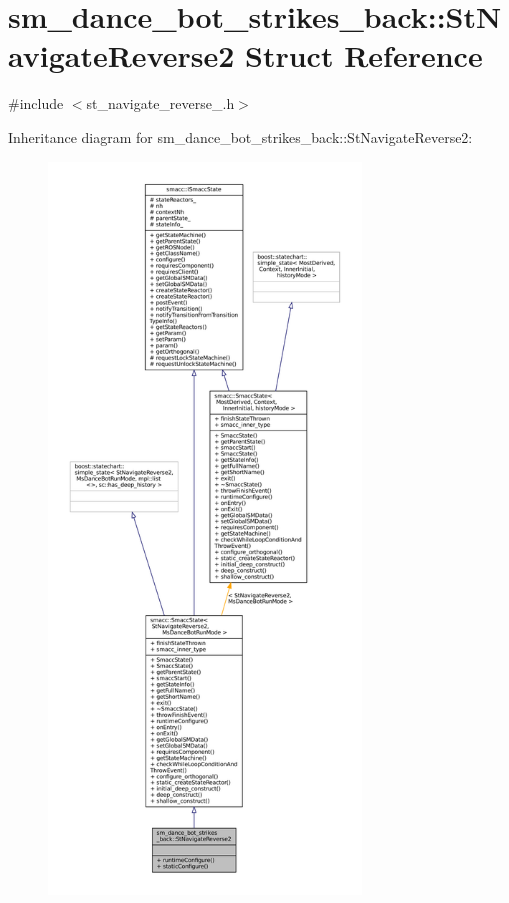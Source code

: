 \hypertarget{structsm__dance__bot__strikes__back_1_1StNavigateReverse2}{}\section{sm\+\_\+dance\+\_\+bot\+\_\+strikes\+\_\+back\+:\+:St\+Navigate\+Reverse2 Struct Reference}
\label{structsm__dance__bot__strikes__back_1_1StNavigateReverse2}


{\ttfamily \#include $<$st\+\_\+navigate\+\_\+reverse\+\_.\+h$>$}



Inheritance diagram for sm\+\_\+dance\+\_\+bot\+\_\+strikes\+\_\+back\+:\+:St\+Navigate\+Reverse2\+:
\nopagebreak
\begin{figure}[H]
\begin{center}
\leavevmode
\includegraphics[height=550pt]{structsm__dance__bot__strikes__back_1_1StNavigateReverse2__inherit__graph}
\end{center}
\end{figure}


